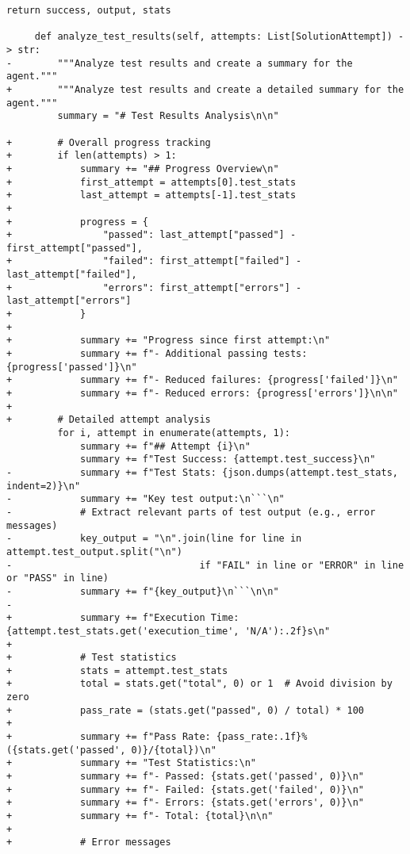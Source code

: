 \begin{lstlisting}[style=diffstyle]
         return success, output, stats
 
     def analyze_test_results(self, attempts: List[SolutionAttempt]) -> str:
-        """Analyze test results and create a summary for the agent."""
+        """Analyze test results and create a detailed summary for the agent."""
         summary = "# Test Results Analysis\n\n"
         
+        # Overall progress tracking
+        if len(attempts) > 1:
+            summary += "## Progress Overview\n"
+            first_attempt = attempts[0].test_stats
+            last_attempt = attempts[-1].test_stats
+            
+            progress = {
+                "passed": last_attempt["passed"] - first_attempt["passed"],
+                "failed": first_attempt["failed"] - last_attempt["failed"],
+                "errors": first_attempt["errors"] - last_attempt["errors"]
+            }
+            
+            summary += "Progress since first attempt:\n"
+            summary += f"- Additional passing tests: {progress['passed']}\n"
+            summary += f"- Reduced failures: {progress['failed']}\n"
+            summary += f"- Reduced errors: {progress['errors']}\n\n"
+        
+        # Detailed attempt analysis
         for i, attempt in enumerate(attempts, 1):
             summary += f"## Attempt {i}\n"
             summary += f"Test Success: {attempt.test_success}\n"
-            summary += f"Test Stats: {json.dumps(attempt.test_stats, indent=2)}\n"
-            summary += "Key test output:\n```\n"
-            # Extract relevant parts of test output (e.g., error messages)
-            key_output = "\n".join(line for line in attempt.test_output.split("\n") 
-                                 if "FAIL" in line or "ERROR" in line or "PASS" in line)
-            summary += f"{key_output}\n```\n\n"
-
+            summary += f"Execution Time: {attempt.test_stats.get('execution_time', 'N/A'):.2f}s\n"
+            
+            # Test statistics
+            stats = attempt.test_stats
+            total = stats.get("total", 0) or 1  # Avoid division by zero
+            pass_rate = (stats.get("passed", 0) / total) * 100
+            
+            summary += f"Pass Rate: {pass_rate:.1f}% ({stats.get('passed', 0)}/{total})\n"
+            summary += "Test Statistics:\n"
+            summary += f"- Passed: {stats.get('passed', 0)}\n"
+            summary += f"- Failed: {stats.get('failed', 0)}\n"
+            summary += f"- Errors: {stats.get('errors', 0)}\n"
+            summary += f"- Total: {total}\n\n"
+            
+            # Error messages

\end{lstlisting}
